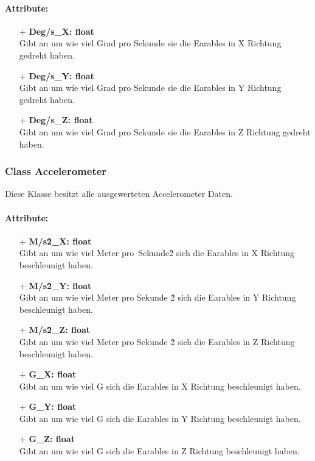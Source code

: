 \documentclass[a4paper,12pt]{article}
\begin{document}
\paragraph{Attribute:}
\begin{itemize}
	\item[+] \textbf{Deg/s\_X: float}\\Gibt an um wie viel Grad pro Sekunde sie die Earables in X Richtung gedreht haben.
	\item[+] \textbf{Deg/s\_Y: float}\\Gibt an um wie viel Grad pro Sekunde sie die Earables in Y Richtung gedreht haben.
	\item[+] \textbf{Deg/s\_Z: float}\\Gibt an um wie viel Grad pro Sekunde sie die Earables in Z Richtung gedreht haben.
\end{itemize}


\subsubsection{Class Accelerometer}
Diese Klasse besitzt alle ausgewerteten Accelerometer Daten.

\paragraph{Attribute:}
\begin{itemize}
	\item[+] \textbf{M/s\^2\_X: float}\\Gibt an um wie viel Meter pro\ Sekunde\^2 sich die Earables in X Richtung beschleunigt haben.
	\item[+] \textbf{M/s\^2\_Y: float}\\Gibt an um wie viel Meter pro Sekunde \^2 sich die Earables in Y Richtung beschleunigt haben.
	\item[+] \textbf{M/s\^2\_Z: float}\\Gibt an um wie viel Meter pro Sekunde \^2 sich die Earables in Z Richtung beschleunigt haben.
	\item[+] \textbf{G\_X: float}\\Gibt an um wie viel G sich die Earables in X Richtung beschleunigt haben.
	\item[+] \textbf{G\_Y: float}\\Gibt an um wie viel G sich die Earables in Y Richtung beschleunigt haben.
	\item[+] \textbf{G\_Z: float}\\Gibt an um wie viel G sich die Earables in Z Richtung beschleunigt haben.
\end{itemize}
\end{document}
